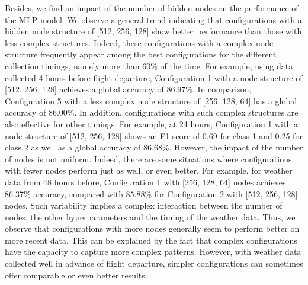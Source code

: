 \documentclass[12pt,oneside]{book} %
\begin{document}
\noindent Besides, we find an impact of the number of hidden nodes on the performance of the MLP model. We observe a general trend indicating that configurations with a hidden node structure of [512, 256, 128] show better performance than those with less complex structures. Indeed, these configurations with a complex node structure frequently appear among the best configurations for the different collection timings, namely more than 60\% of the time. For example, using data collected 4 hours before flight departure, Configuration 1 with a node structure of [512, 256, 128] achieves a global accuracy of 86.97\%. In comparison, Configuration 5 with a less complex node structure of [256, 128, 64] has a global accuracy of 86.00\%. In addition, configurations with such complex structures are also effective for other timings. For example, at 24 hours, Configuration 1 with a node structure of [512, 256, 128] shows an F1-score of 0.69 for class 1 and 0.25 for class 2 as well as a global accuracy of 86.68\%. However, the impact of the number of nodes is not uniform. Indeed, there are some situations where configurations with fewer nodes perform just as well, or even better. For example, for weather data from 48 hours before, Configuration 1 with [256, 128, 64] nodes achieves 86.37\% accuracy, compared with 85.88\% for Configuration 2 with [512, 256, 128] nodes. Such variability implies a complex interaction between the number of nodes, the other hyperparameters and the timing of the weather data. Thus, we observe that configurations with more nodes generally seem to perform better on more recent data. This can be explained by the fact that complex configurations have the capacity to capture more complex patterns. However, with weather data collected well in advance of flight departure, simpler configurations can sometimes offer comparable or even better results.
\end{document}
